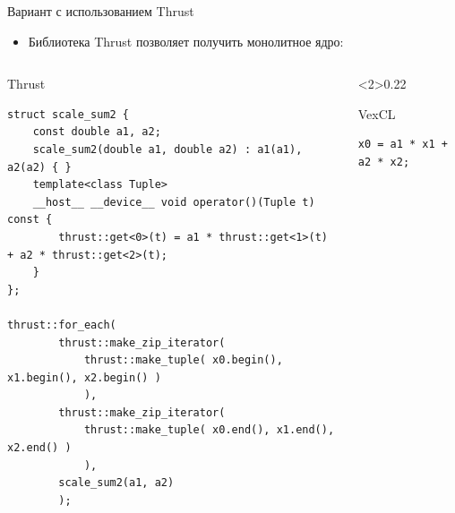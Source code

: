 \documentclass[@BEAMER_OPTIONS@]{beamer}
\begin{document}
\begin{frame}[fragile]{Вариант с использованием Thrust}
    \begin{itemize}
        \item Библиотека Thrust позволяет получить монолитное ядро:
    \end{itemize}
    \begin{columns}
        \begin{column}{0.70\textwidth}
            \begin{exampleblock}{Thrust}
                \begin{adjustbox}{width=0.95\textwidth,height=0.6\textheight,keepaspectratio}
                    \begin{lstlisting}
struct scale_sum2 {
    const double a1, a2;
    scale_sum2(double a1, double a2) : a1(a1), a2(a2) { }
    template<class Tuple>
    __host__ __device__ void operator()(Tuple t) const {
        thrust::get<0>(t) = a1 * thrust::get<1>(t) + a2 * thrust::get<2>(t);
    }
};

thrust::for_each(
        thrust::make_zip_iterator(
            thrust::make_tuple( x0.begin(), x1.begin(), x2.begin() )
            ),
        thrust::make_zip_iterator(
            thrust::make_tuple( x0.end(), x1.end(), x2.end() )
            ),
        scale_sum2(a1, a2)
        );
                    \end{lstlisting}
                \end{adjustbox}
            \end{exampleblock}
        \end{column}
        \begin{column}<2>{0.22\textwidth}
            \begin{exampleblock}{VexCL}
                \begin{adjustbox}{width=0.95\textwidth,height=0.6\textheight,keepaspectratio}
                    \begin{lstlisting}
x0 = a1 * x1 + a2 * x2;
                    \end{lstlisting}
                \end{adjustbox}
            \end{exampleblock}
        \end{column}
    \end{columns}
\end{frame}
\end{document}
